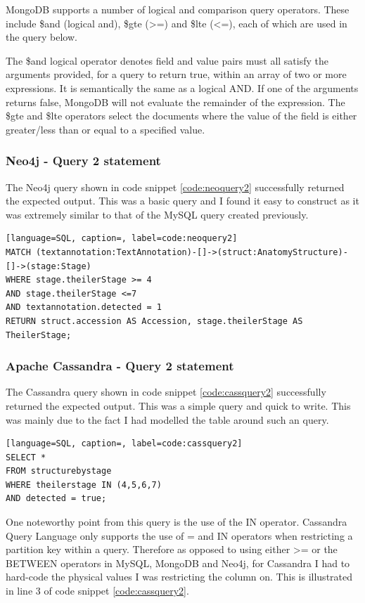 MongoDB supports a number of logical and comparison query operators. These include \$and (logical and), \$gte (>=) and \$lte (<=), each of which are used in the query below.

\parindent 15pt

The \$and logical operator denotes field and value pairs must all satisfy the arguments provided, for a query to return true, within an array of two or more expressions. It is semantically the same as a logical AND. If one of the arguments returns false, MongoDB will not evaluate the remainder of the expression. The \$gte and \$lte operators select the documents where the value of the field is either greater/less than or equal to a specified value.

\subsubsection*{Neo4j - Query 2 statement}\label{neoquery2statement}
The Neo4j query shown in code snippet \ref{code:neoquery2} successfully returned the expected output. This was a basic query and I found it easy to construct as it was extremely similar to that of the MySQL query created previously.

\begin{lstlisting}[language=SQL, caption=, label=code:neoquery2]
MATCH (textannotation:TextAnnotation)-[]->(struct:AnatomyStructure)-[]->(stage:Stage)
WHERE stage.theilerStage >= 4
AND stage.theilerStage <=7
AND textannotation.detected = 1
RETURN struct.accession AS Accession, stage.theilerStage AS TheilerStage;
\end{lstlisting}

\subsubsection*{Apache Cassandra - Query 2 statement}\label{cassquery2statement}
The Cassandra query shown in code snippet \ref{code:cassquery2} successfully returned the expected output. This was a simple query and quick to write. This was mainly due to the fact I had modelled the table around such an query.

\begin{lstlisting}[language=SQL, caption=, label=code:cassquery2]
SELECT *
FROM structurebystage
WHERE theilerstage IN (4,5,6,7)
AND detected = true;
\end{lstlisting}

One noteworthy point from this query is the use of the IN operator. Cassandra Query Language only supports the use of = and IN operators when restricting a partition key within a query. Therefore as opposed to using either >= or the BETWEEN operators in MySQL, MongoDB and Neo4j, for Cassandra I had to hard-code the physical values I was restricting the column on. This is illustrated in line 3 of code snippet \ref{code:cassquery2}.

